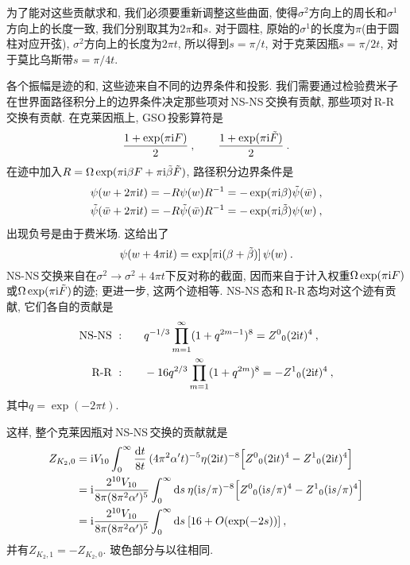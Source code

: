 为了能对这些贡献求和, 我们必须要重新调整这些曲面, 使得$ \sigma^{2} $方向上的周长和$ \sigma^{1} $方向上的长度一致, 我们分别取其为$ 2\pi $和$ s$. 对于圆柱, 原始的$ \sigma^{1} $的长度为$ \pi $(由于圆柱对应开弦), $\sigma^{2} $方向上的长度为$ 2\pi t$, 所以得到$ s=\pi/t$, 对于克莱因瓶$ s=\pi/2t$, 对于莫比乌斯带$ s=\pi/4t$. 

各个振幅是迹的和, 这些迹来自不同的边界条件和投影. 我们需要通过检验费米子在世界面路径积分上的边界条件决定那些项对\,NS-NS\,交换有贡献, 那些项对\,R-R\,交换有贡献. 在克莱因瓶上, GSO\,投影算符是
\begin{equation}
    \frac{1+\exp(\pi\mathrm{i} F)}{2} \:,\qquad \frac{1+\exp(\pi\mathrm{i}\tilde{F})}{2} \:. \label{10.8.7}
\end{equation}
在迹中加入$ R=\Omega \exp(\pi\mathrm{i}\beta F +\pi\mathrm{i}\tilde{\beta}\tilde{F})$, 路径积分边界条件是
\begin{subequations}
    \begin{align}
        \psi(w+2\pi\mathrm{i} t)&= -R\psi(w)R^{-1} =-\exp(\pi\mathrm{i}\beta)\tilde{\psi}(\bar{w}) \:, \label{10.8.8a} \\
        \tilde{\psi}(\bar{w}+2\pi\mathrm{i} t)&= -R\tilde{\psi}(\bar{w})R^{-1} =-\exp(\pi\mathrm{i}\tilde{\beta})\psi(w)\:,\label{10.8.8b}
    \end{align} \label{10.8.8}
\end{subequations}
出现负号是由于费米场. 这给出了
\begin{equation}
    \psi(w+4\pi\mathrm{i} t) = \exp[\pi\mathrm{i}(\beta+\tilde{\beta})]\,\psi(w) \:. \label{10.8.9}
\end{equation}
NS-NS\,交换来自在$ \sigma^{2}\to\sigma^{2}+4\pi t $下反对称的截面, 因而来自于计入权重$ \Omega\exp(\pi\mathrm{i} F)$或$ \Omega\exp(\pi\mathrm{i}\tilde{F}) $的迹; 更进一步, 这两个迹相等. NS-NS\,态和\,R-R\,态均对这个迹有贡献, 它们各自的贡献是
\begin{subequations}
    \begin{align}
        \text{NS-NS }: \qquad &q^{-1/3}\prod_{m=1}^{\infty} (1+q^{2m-1})^{8} = Z^{0}{}_{0}(2\mathrm{i} t)^{4} \:, \label{10.8.10a} \\
        \text{R-R }: \qquad &-16 q^{2/3} \prod_{m=1}^{\infty} (1+q^{2m})^{8} =- Z^{1}{}_{0}(2\mathrm{i} t)^{4} \:,
        \label{10.8.10b}
    \end{align} \label{10.8.10}
\end{subequations}
其中$ q=\exp(-2\pi t)$.

这样, 整个克莱因瓶对\,NS-NS\,交换的贡献就是
\begin{align}
    Z_{K_{2},0} &= \mathrm{i} V_{10} \int_{0}^{\infty}\frac{\mathrm{d} t}{8t}\: (4\pi^{2}\alpha^{\prime}t)^{-5} \eta(2\mathrm{i} t)^{-8}
    \Bigl[ Z^{0}{}_{0}(2\mathrm{i} t)^{4}-Z^{1}{}_{0}(2\mathrm{i} t)^{4}\Bigr] \nonumber \\
    &= \mathrm{i} \frac{2^{10}V_{10}}{8\pi (8\pi^{2}\alpha^{\prime})^{5}}\int^{\infty}_{0}\mathrm{d} s \: 
    \eta(\mathrm{i} s/\pi)^{-8} \Bigl[ Z^{0}{}_{0}(\mathrm{i} s/\pi)^{4}-Z^{1}{}_{0}(\mathrm{i} s/\pi)^{4} \Bigr] \nonumber \\
    &= \mathrm{i} \frac{2^{10}V_{10}}{8\pi (8\pi^{2}\alpha^{\prime})^{5}}\int^{\infty}_{0}\mathrm{d} s \: 
      [16 + O(\exp(-2s))] \:, \label{10.8.11}
\end{align}
并有$ Z_{K_{2},1}=-Z_{K_{2},0}$. 玻色部分与以往相同.


